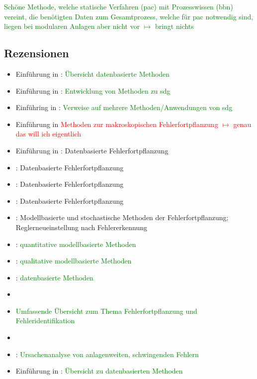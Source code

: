 \textcolor{green}{Sch\"one Methode, welche statische Verfahren (\ac{pac}) mit Prozesswissen (\ac{bbn}) vereint, die ben\"otigten Daten zum Gesamtprozess, welche f\"ur \ac{pac} notwendig sind, liegen bei modularen Anlagen aber nicht vor $\mapsto$ bringt nichts}

\subsection{Rezensionen}
\begin{itemize}
\item Einf\"uhrung in \cite{Zhang_2017}: \textcolor{green}{\"Ubersicht datenbasierte Methoden}
\item Einf\"uhrung in \cite{Yang_2010}: \textcolor{green}{Entwicklung von Methoden zu \ac{sdg}}
\item Einf\"uhring in \cite{Mallick_2013}: \textcolor{green}{Verweise auf mehrere Methoden/Anwendungen von \ac{sdg}}
\item Einf\"uhrung in \cite{Cai_2015} \textcolor{red}{Methoden zur makroskopischen Fehlerfortpflanzung $\mapsto$ genau das will ich eigentlich }
\item Einf\"uhrung in \cite{Wang_2016}: Datenbasierte Fehlerfortpflanzung
\item \cite{Thornhill_2006}: Datenbasierte Fehlerfortpflanzung
\item \cite{Yin_2014}: Datenbasierte Fehlerfortpflanzung
\item \cite{Varga_2013}: Datenbasierte Fehlerfortpflanzung
\item \cite{Hwang_2010}: Modellbasierte und stochastische Methoden der Fehlerfortpflanzung; Reglerneueinstellung nach Fehlererkennung
\item \cite{Venkatasubramanian_2003}: \textcolor{green}{quantitative modellbasierte Methoden}
\item \cite{Venkatasubramanian_2003a}: \textcolor{green}{qualitative modellbasierte Methoden}
\item \cite{Venkatasubramanian_2003b}: \textcolor{green}{datenbasierte Methoden}
\item \cite{Ng_2010}
\item \cite{Zhang2008} \textcolor{green}{Umfassende \"Ubersicht zum Thema Fehlerfortpflanzung und Fehleridentifikation}
\item \cite{Yang2012}
\item \cite{Duan2014}: \textcolor{green}{Ursachenanalyse von anlagenweiten, schwingenden Fehlern}
\item Einf\"uhrung in \cite{Li_2016}: \textcolor{green}{\"Ubersicht zu datenbasierten Methoden}
\end{itemize}


